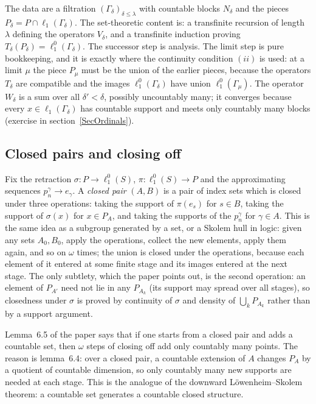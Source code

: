 \documentclass[12pt]{article}
\theoremstyle{definition}
\theoremstyle{remark}
\newcommand{\lo}[1]{\ell_1^0(#1)}
\newcommand{\ellone}[1]{\ell_1(#1)}
\begin{document}
The data are a filtration ${(\Gamma_\delta)}_{\delta\leq\lambda}$ with
countable blocks $N_\delta$ and the pieces $P_\delta=P\cap\ellone{\Gamma_\delta}$.
The set-theoretic content is: a transfinite recursion of length $\lambda$
defining the operators $V_\delta$, and a transfinite induction proving
$T_\delta(P_\delta)=\lo{\Gamma_\delta}$. The successor step is analysis. The
limit step is pure bookkeeping, and it is exactly where the continuity
condition $(ii)$ is used: at a limit $\mu$ the piece $P_\mu$ must be the
union of the earlier pieces, because the operators $T_\delta$ are compatible
and the images $\lo{\Gamma_\delta}$ have union $\lo{\Gamma_\mu}$. The
operator $W_\delta$ is a sum over all $\delta'<\delta$, possibly uncountably
many; it converges because every $x\in\ellone{\Gamma_\delta}$ has countable
support and meets only countably many blocks (exercise in
section~\ref{SecOrdinals}).

\subsection*{Closed pairs and closing off}

Fix the retraction $\sigma:P\to\lo{S}$, $\pi:\lo{S}\to P$ and the
approximating sequences $p^\gamma_n\to e_\gamma$. A \emph{closed pair}
$(A,B)$ is a pair of index sets which is closed under three operations:
taking the support of $\pi(e_s)$ for $s\in B$, taking the support of
$\sigma(x)$ for $x\in P_A$, and taking the supports of the $p^\gamma_n$ for
$\gamma\in A$. This is the same idea as a subgroup generated by a set, or a
Skolem hull in logic: given any sets $A_0,B_0$, apply the operations, collect
the new elements, apply them again, and so on $\omega$ times; the union is
closed under the operations, because each element of it entered at some
finite stage and its images entered at the next stage. The only subtlety,
which the paper points out, is the second operation: an element of $P_{A'}$
need not lie in any $P_{A_k}$ (its support may spread over all stages), so
closedness under $\sigma$ is proved by continuity of $\sigma$ and density of
$\bigcup_kP_{A_k}$ rather than by a support argument.

Lemma~6.5 of the paper says that if one starts from a closed pair and adds a
countable set, then $\omega$ steps of closing off add only countably many
points. The reason is lemma~6.4: over a closed pair, a countable extension
of $A$ changes $P_A$ by a quotient of countable dimension, so only countably
many new supports are needed at each stage. This is the analogue of the
downward L\"owenheim--Skolem theorem: a countable set generates a countable
closed structure.
\end{document}
